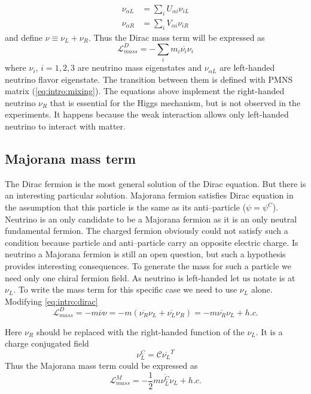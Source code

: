 \documentclass[../main.tex]{subfiles}
\begin{document}
\begin{align}
\nu_{\alpha L}&=\sum_iU_{\alpha i}\nu_{iL} \nonumber \\
\nu_{\alpha R}&=\sum_iV_{\alpha i}\nu_{iR}
\end{align}
and define $\nu\equiv\nu_L+\nu_R$. Thus the Dirac mass term will be expressed as
\begin{equation}
\label{eq:intro:dirac}
\mathcal{L}^{D}_{mass}=-\sum_im_i\overline{\nu_i}\nu_i
\end{equation}
where $\nu_i$, $i=1, 2, 3$ are neutrino mass eigenstates and $\nu_{\alpha L}$ are left-handed neutrino flavor eigenstate. The transition between them is defined with PMNS matrix (\autoref{eq:intro:mixing}). The equations above implement the right-handed neutrino $\nu_R$ that is essential for the Higgs mechanism, but is not observed in the experiments. It happens because the weak interaction allows only left-handed neutrino to interact with matter.

\subsection{Majorana mass term}
The Dirac fermion is the most general solution of the Dirac equation. But there is an interesting particular solution. Majorana fermion satisfies Dirac equation in the assumption that this particle is the same as its anti--particle ($\psi=\psi^C$). Neutrino is an only candidate to be a Majorana fermion as it is an only neutral fundamental fermion. The charged fermion obviously could not satisfy such a condition because particle and anti--particle carry an opposite electric charge. Is neutrino a Majorana fermion is still an open question, but such a hypothesis provides interesting consequences. To generate the mass for such a particle we need only one chiral fermion field. As neutrino is left-handed let us notate is at $\nu_L$. To write the mass term for this specific case we need to use $\nu_L$ alone. Modifying \autoref{eq:intro:dirac}
\begin{equation}
\mathcal{L}^D_{mass}=-m\overline{\nu}\nu=-m\left(\overline{\nu_R}\nu_L+\overline{\nu_L}\nu_R\right)=-m\overline{\nu_R}\nu_L+h.c.
\end{equation}

Here $\nu_R$ should be replaced with the right-handed function of the $\nu_L$. It is a charge conjugated field
\begin{equation}
\nu_L^C=\mathcal{C}\overline{\nu_L}^T
\end{equation}
Thus the Majorana mass term could be expressed as
\begin{equation}
\mathcal{L}^M_{mass}=-\frac{1}{2}m\overline{\nu_L^C}\nu_L+h.c.
\end{equation}
\end{document}
